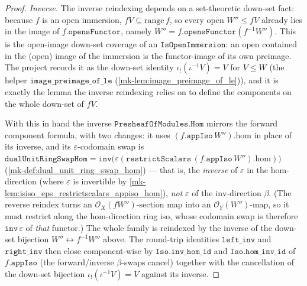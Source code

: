\begin{proof}
  \emph{Inverse.} The inverse reindexing depends on a set-theoretic down-set fact: because
  \(f\) is an open immersion, \(fV \subseteq \mathrm{range}\,f\), so every open
  \(W'' \le fV\) already lies in the image of \(f.\mathtt{opensFunctor}\), namely
  \(W'' = f.\mathtt{opensFunctor}(f^{-1}W'')\). This is the open-image down-set coverage of an
  \(\mathtt{IsOpenImmersion}\): an open contained in the (open) image of the immersion is the
  functor-image of its own preimage. The project records it as the down-set identity
  \(\iota_!(\iota^{-1}V) = V\) for \(V \le W\) (the helper
  \(\mathtt{image\_preimage\_of\_le}\) (\ref{mk-lem:image_preimage_of_le})),
  and it is exactly the lemma the inverse reindexing relies on to define the components on the
  whole down-set of \(fV\).

  With this in hand the inverse \(\mathtt{PresheafOfModules.Hom}\) mirrors the forward
  component formula, with two changes: it uses \((f.\mathtt{appIso}\,W'').\mathrm{hom}\) in
  place of its inverse, and its \(\varepsilon\)-codomain swap is
  \(\mathtt{dualUnitRingSwapHom} = \mathtt{inv}\bigl(\varepsilon(\mathtt{restrictScalars}\,
  (f.\mathtt{appIso}\,W'').\mathrm{hom})\bigr)\) (\ref{mk-def:dual_unit_ring_swap_hom})
  --- that is, the \emph{inverse} of \(\varepsilon\) in the \(\mathrm{hom}\)-direction (where
  \(\varepsilon\) is invertible by
  \ref{mk-lem:isiso_eps_restrictscalars_appiso_hom}), \emph{not}
  \(\varepsilon\) of the \(\mathrm{inv}\)-direction \(\beta\). (The reverse reindex turns an
  \(\mathcal{O}_X(fW'')\)-section map into an \(\mathcal{O}_Y(W'')\)-map, so it must restrict
  along the \(\mathrm{hom}\)-direction ring iso, whose codomain swap is therefore \(\mathtt{inv}\,
  \varepsilon\) of \emph{that} functor.) The whole family is reindexed by the inverse of the
  down-set bijection \(W'' \leftrightarrow f^{-1}W''\) above. The round-trip identities \(\mathtt{left\_inv}\)
  and \(\mathtt{right\_inv}\) then close component-wise by \(\mathtt{Iso.inv\_hom\_id}\) and
  \(\mathtt{Iso.hom\_inv\_id}\) of \(f.\mathtt{appIso}\) (the forward/inverse \(\beta\)-swaps
  cancel) together with the cancellation of the down-set bijection
  \(\iota_!(\iota^{-1}V) = V\) against its inverse.


\end{proof}
